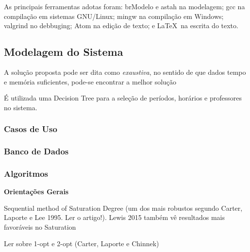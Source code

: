 \documentclass[12pt,a4paper]{article}
\begin{document}
			\par As principais ferramentas adotas foram: brModelo e astah na modelagem; gcc na compilação em sistemas GNU/Linux; mingw na compilação em Windows; valgrind no debbuging; Atom na edição de texto; e \LaTeX \, na escrita do texto.

		\subsection{Modelagem do Sistema}

			A solução proposta pode ser dita como \textit{exaustiva}, no sentido de que dados tempo e memória suficientes, pode-se encontrar a melhor solução

			É utilizada uma Decision Tree para a seleção de períodos, horários e professores no sistema.

			\lipsum[1]


			\subsubsection{Casos de Uso}

				\lipsum[1]

			\subsubsection{Banco de Dados}

				\lipsum[1]

			\subsubsection{Algoritmos}

				\textbf{Orientações Gerais}

				\par Sequential method of Saturation Degree (um dos mais robustos segundo Carter, Laporte e Lee 1995. Ler o artigo!).
				Lewis 2015 também vê resultados mais favoráveis no Saturation

				\par Ler sobre 1-opt e 2-opt (Carter, Laporte e Chinnek)
\end{document}
